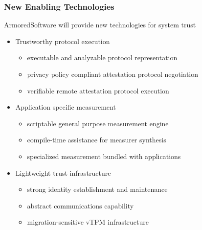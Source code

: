 \documentclass{beamer}
\begin{document}
\begin{frame}
  \frametitle{New Enabling Technologies}

  ArmoredSoftware will provide new technologies for system trust
  
  \begin{itemize}
  \item Trustworthy protocol execution
    \begin{itemize}
    \item executable and analyzable protocol representation
    \item privacy policy compliant attestation protocol negotiation
    \item verifiable remote attestation protocol execution
    \end{itemize}
  \item Application specific measurement
    \begin{itemize}
    \item scriptable general purpose measurement engine
    \item compile-time assistance for measurer synthesis
    \item specialized measurement bundled with applications
    \end{itemize}
  \item Lightweight trust infrastructure
    \begin{itemize}
    \item strong identity establishment and maintenance
    \item abstract communications capability
    \item migration-sensitive vTPM infrastructure
    \end{itemize}
  \end{itemize}
\end{frame}
\end{document}
